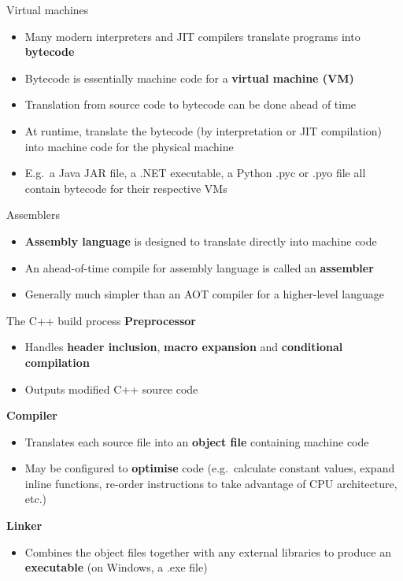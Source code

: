 \begin{frame}{Virtual machines}
	\begin{itemize}
		\pause\item Many modern interpreters and JIT compilers translate programs into \textbf{bytecode}
		\pause\item Bytecode is essentially machine code for a \textbf{virtual machine (VM)}
		\pause\item Translation from source code to bytecode can be done ahead of time
		\pause\item At runtime, translate the bytecode (by interpretation or JIT compilation) into machine code for the physical machine
		\pause\item E.g.\ a Java JAR file, a .NET executable, a Python .pyc or .pyo file
			all contain bytecode for their respective VMs
	\end{itemize}
\end{frame}

\begin{frame}{Assemblers}
	\begin{itemize}
		\pause\item \textbf{Assembly language} is designed to translate directly into machine code
		\pause\item An ahead-of-time compile for assembly language is called an \textbf{assembler}
		\pause\item Generally much simpler than an AOT compiler for a higher-level language
	\end{itemize}
\end{frame}

\begin{frame}[fragile]{The C++ build process}
    \textbf{Preprocessor} \pause
    \begin{itemize}
        \item Handles \textbf{header inclusion}, \textbf{macro expansion} and \textbf{conditional compilation} \pause
        \item Outputs modified C++ source code \pause				
    \end{itemize}
    \textbf{Compiler} \pause
    \begin{itemize}
        \item Translates each source file into an \textbf{object file} containing machine code \pause
        \item May be configured to \textbf{optimise} code (e.g.\ calculate constant values, expand inline functions,
					re-order instructions to take advantage of CPU architecture, etc.) \pause
    \end{itemize}
    \textbf{Linker} \pause
    \begin{itemize}
        \item Combines the object files together with any external libraries to produce an \textbf{executable}
            (on Windows, a .exe file)
    \end{itemize}
\end{frame}

